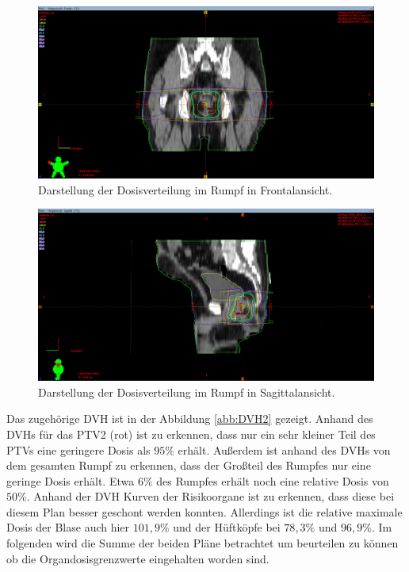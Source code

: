 \begin{figure}[H]
  \centering
  \includegraphics[width=\textwidth]{Bilder/Rektum2_Y.png}
  \caption{Darstellung der Dosisverteilung im Rumpf in Frontalansicht.}
  \label{abb:Y2}
\end{figure}

\begin{figure}[H]
  \centering
  \includegraphics[width=\textwidth]{Bilder/Rektum2_X.png}
  \caption{Darstellung der Dosisverteilung im Rumpf in Sagittalansicht.}
  \label{abb:X2}
\end{figure}

Das zugehörige DVH ist in der Abbildung \ref{abb:DVH2} gezeigt. Anhand des DVHs für das PTV2 (rot)
ist zu erkennen, dass nur ein sehr kleiner Teil des PTVs eine geringere Dosis als $95\%$ erhält.
Außerdem ist anhand des DVHs von dem gesamten Rumpf zu erkennen, dass der Großteil des Rumpfes
nur eine geringe Dosis erhält. Etwa $6\%$ des Rumpfes erhält noch eine relative Dosis von $50\%$.
Anhand der DVH Kurven der Risikoorgane ist zu erkennen, dass diese bei diesem Plan besser geschont werden konnten.
Allerdings ist die relative maximale Dosis der Blase auch hier $101,9\%$ und der Hüftköpfe bei $78,3\%$ und $96,9\%$.
Im folgenden wird die Summe der beiden Pläne betrachtet um beurteilen zu können ob die Organdosisgrenzwerte eingehalten
worden sind.

